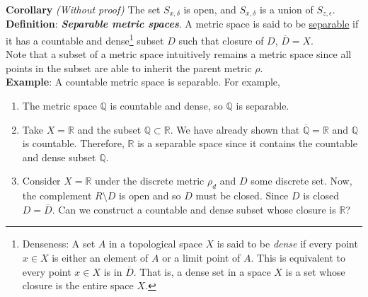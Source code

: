\documentclass[12pt]{article}
\newlength\tindent
\renewcommand{\indent}{\hspace*{\tindent}}
\newcommand{\R}{\mathbb R}
\newcommand{\Q}{\mathbb Q}
\begin{document}
%
%
{\bf Corollary} {\em (Without proof)} The set $S_{x,\delta}$ is open, and $S_{x,\delta}$ is a union of $S_{z,\epsilon}$. \\

%
%
{\bf Definition}: {\bf \em Separable metric spaces}. A metric space is said to be \underline{separable} if it has a countable and dense\footnote{Denseness: A set $A$ in a topological space $X$ is said to be {\em dense} if every point $x \in X$ is either an element of $A$ or a limit point of $A$. This is equivalent to every point $x \in X$ is in $\overline{D}$. That is, a dense set in a space $X$ is a set whose closure is the entire space $X$.} subset $D$ such that closure of $D$,  $\overline{D} = X$. \\

\indent Note that a subset of a metric space intuitively remains a metric space since all points in the subset are able to inherit the parent metric $\rho$. \\

%
%
{\bf Example}: A countable metric space is separable. For example, 
\begin{enumerate}
	\item The metric space $\Q$ is countable and dense, so $\Q$ is separable.
	\item Take $X = \R$ and the subset $\Q \subset \R$. We have already shown that $\overline{\Q} = \R$ and $\Q$ is countable. Therefore, $\R$ is a separable space since it contains the countable and dense subset $\Q$.
	\item Consider $X = \R$ under the discrete metric $\rho_d$ and $D$ some discrete set. Now, the complement $R\setminus D$ is open and so $D$ must be closed. Since $D$ is closed $D = \overline{D}$. Can we construct a countable and dense subset whose closure is $\R$?
\end{enumerate}
\end{document}
